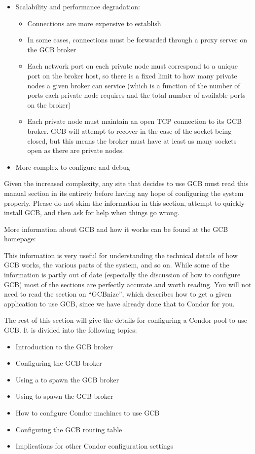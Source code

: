 \begin{itemize}
\item Scalability and performance degradation: 
  \begin{itemize}
  \item Connections are more expensive to establish
  \item In some cases, connections must be forwarded through a proxy
    server on the GCB broker
  \item Each network port on each private node must correspond to a
    unique port on the broker host, so there is a fixed limit to how
    many private nodes a given broker can service (which is a function
    of the number of ports each private node requires and the total
    number of available ports on the broker)
  \item Each private node must maintain an open TCP connection to its
    GCB broker.  GCB will attempt to recover in the case of the socket
    being closed, but this means the broker must have at least as many
    sockets open as there are private nodes.
  \end{itemize}

\item More complex to configure and debug

\end{itemize}

Given the increased complexity, any site that decides to use GCB must
read this manual section in its entirety before having any hope of
configuring the system properly.
Please do not skim the information in this section, attempt to quickly
install GCB, and then ask for help when things go wrong.

More information about GCB and how it works can be found at the GCB
homepage:


This information is very useful for understanding the technical
details of how GCB works, the various parts of the system, and so on.
While some of the information is partly out of date (especially the
discussion of how to configure GCB) most of the sections are perfectly
accurate and worth reading.
You will not need to read the section on ``GCBnize'', which describes
how to get a given application to use GCB, since we have already done
that to Condor for you.

The rest of this section will give the details for configuring a
Condor pool to use GCB.
It is divided into the following topics:

\begin{itemize}
\item Introduction to the GCB broker
\item Configuring the GCB broker
\item Using a  to spawn the GCB broker
\item Using  to spawn the GCB broker
\item How to configure Condor machines to use GCB
\item Configuring the GCB routing table
\item Implications for other Condor configuration settings
\end{itemize}


